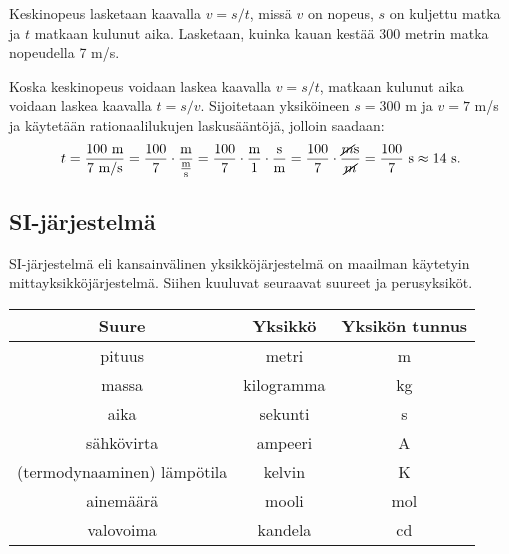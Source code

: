 \begin{esimerkki}
Keskinopeus lasketaan kaavalla $v=s/t$, missä $v$ on nopeus, $s$ on kuljettu matka ja $t$ matkaan kulunut aika.
Lasketaan, kuinka kauan kestää 300 metrin matka nopeudella 7 m/s.

Koska keskinopeus voidaan laskea kaavalla $v=s/t$, matkaan kulunut aika voidaan laskea kaavalla $t=s/v$.
Sijoitetaan yksiköineen $s=300$ m ja $v= 7$ m/s ja käytetään rationaalilukujen laskusääntöjä, jolloin saadaan:
\begin{equation*}
t=\frac{100 \textrm{ m}}{ 7 \textrm{ m/s}} = \frac{100}{7} \cdot \frac{\textrm{m}}{\frac{\textrm{m}}{\textrm{s}}} 
= \frac{100}{7} \cdot \frac{\textrm{m}}{1} \cdot \frac{\textrm{s}}{\textrm{m}}
= \frac{100}{7} \cdot \frac{\cancel{m}\textrm{s}}{\cancel{m}}
=\frac{100}{7} \textrm{ s} \approx 14 \textrm{ s}.
\end{equation*}
\end{esimerkki}


\subsection*{SI-järjestelmä}

SI-järjestelmä eli kansainvälinen yksikköjärjestelmä on maailman käytetyin mittayksikköjärjestelmä.
Siihen kuuluvat seuraavat suureet ja perusyksiköt.

\begin{tabular}{c|c|c}
Suure & Yksikkö & Yksikön tunnus\\
\hline
pituus & metri &	m\\
massa & kilogramma & kg 	\\
aika & sekunti & s \\
sähkövirta & ampeeri & A \\
(termodynaaminen) lämpötila & kelvin & K \\
ainemäärä & mooli & mol \\
valovoima & kandela & cd
\end{tabular}

